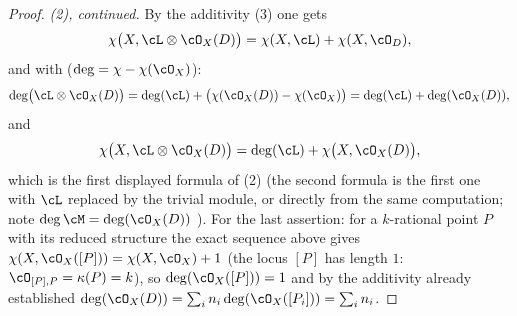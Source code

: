 \begin{proof}
\emph{(2), continued.}  By the additivity (3) one gets
\[
\chi\bigl(X,\cL\otimes\cO_X(D)\bigr)=\chi(X,\cL)+\chi(X,\cO_D),
\]
and with  ($\deg=\chi-\chi(\cO_X)$):
\[
\deg\bigl(\cL\otimes\cO_X(D)\bigr)
=\deg(\cL)+\bigl(\chi(\cO_X(D))-\chi(\cO_X)\bigr)
=\deg(\cL)+\deg(\cO_X(D)),
\]
and
\[
\chi\bigl(X,\cL\otimes\cO_X(D)\bigr)
=\deg(\cL)+\chi\bigl(X,\cO_X(D)\bigr),
\]
which is the first displayed formula of (2) (the second formula is the
first one with $\cL$ replaced by the trivial module, or directly from
the same computation; note $\deg\cM=\deg(\cO_X(D))$
).  For the last assertion: for a
$k$-rational point $P$ with its reduced structure the exact sequence
above gives $\chi(X,\cO_X([P]))=\chi(X,\cO_X)+1$ (the locus $[P]$ has
length $1$: $\cO_{[P],P}=\kappa(P)=k$), so
$\deg(\cO_X([P]))=1$ and by the additivity already established
$\deg(\cO_X(D))=\sum_in_i\deg(\cO_X([P_i]))=\sum_in_i$.
\end{proof}

